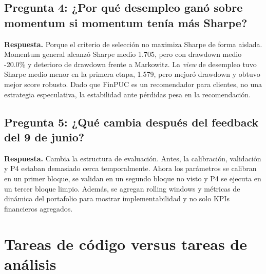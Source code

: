 \documentclass[11pt]{article}
\begin{document}
\subsection{Pregunta 4: ¿Por qué desempleo ganó sobre momentum si momentum tenía más Sharpe?}

\textbf{Respuesta.} Porque el criterio de selecci\'on no maximiza Sharpe de forma aislada. Momentum general alcanz\'o Sharpe medio 1.705, pero con drawdown medio -20.0\% y deterioro de drawdown frente a Markowitz. La \textit{view} de desempleo tuvo Sharpe medio menor en la primera etapa, 1.579, pero mejor\'o drawdown y obtuvo mejor score robusto. Dado que FinPUC es un recomendador para clientes, no una estrategia especulativa, la estabilidad ante p\'erdidas pesa en la recomendaci\'on.

\subsection{Pregunta 5: ¿Qué cambia después del feedback del 9 de junio?}

\textbf{Respuesta.} Cambia la estructura de evaluaci\'on. Antes, la calibraci\'on, validaci\'on y P4 estaban demasiado cerca temporalmente. Ahora los par\'ametros se calibran en un primer bloque, se validan en un segundo bloque no visto y P4 se ejecuta en un tercer bloque limpio. Adem\'as, se agregan rolling windows y m\'etricas de din\'amica del portafolio para mostrar implementabilidad y no solo KPIs financieros agregados.

\section{Tareas de c\'odigo versus tareas de an\'alisis}
\end{document}

